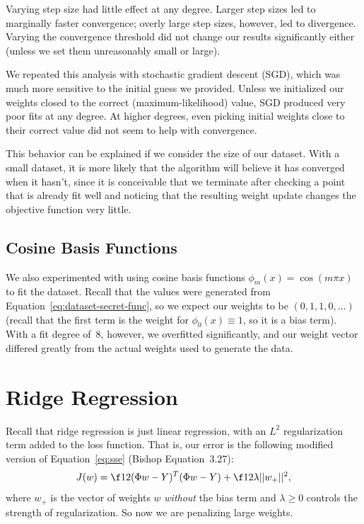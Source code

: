 \documentclass{article}
\begin{document}
\begin{multicols}{2}
Varying step size had little effect at any degree.
Larger step sizes led to marginally faster convergence; overly large step sizes, however, led to divergence.
Varying the convergence threshold did not change our results significantly either (unless we set them unreasonably small or large).

We repeated this analysis with stochastic gradient descent (SGD), which was much more sensitive to the initial guess we provided.
Unless we initialized our weights closed to the correct (maximum-likelihood) value, SGD produced very poor fits at any degree.
At higher degrees, even picking initial weights close to their correct value did not seem to help with convergence.

This behavior can be explained if we consider the size of our dataset.
With a small dataset, it is more likely that the algorithm will believe it has converged when it hasn't, since it is conceivable that we terminate after checking a point that is already fit well and noticing that the resulting weight update changes the objective function very little.


\subsection{Cosine Basis Functions}

We also experimented with using cosine basis functions $\phi_m(x) = \cos(m\pi x)$ to fit the dataset.
Recall that the values were generated from Equation~\ref{eq:dataset-secret-func}, so we expect our weights to be $(0, 1, 1, 0, \dots)$ (recall that the first term is the weight for $\phi_0(x) \equiv 1$, so it is a bias term).
With a fit degree of~8, however, we overfitted significantly, and our weight vector differed greatly from the actual weights used to generate the data.




\section{Ridge Regression}

Recall that ridge regression is just linear regression, with an $L^2$ regularization term added to the loss function. That is, our error is the following modified version of Equation~\ref{eq:sse} (Bishop Equation~3.27):
\begin{equation}\label{eq:moderr}
J(w) = \f12 (\Phi w - Y)^T (\Phi w - Y) + \f12 \lambda ||w_+||^2,
\end{equation}
where $w_+$ is the vector of weights $w$ \emph{without} the bias term and $\lambda\ge 0$ controls the strength of regularization. So now we are penalizing large weights.


\end{multicols}
\end{document}
